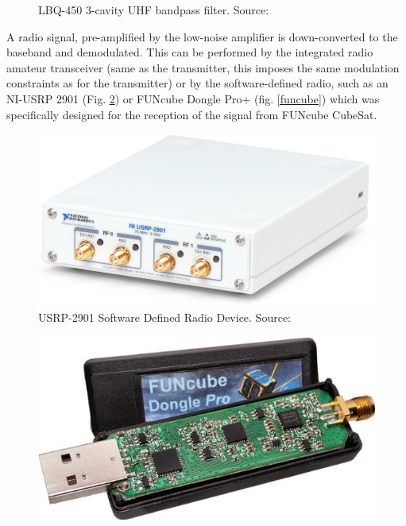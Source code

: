 \begin{minipage}{\linewidth}
\begin{minipage}{0.45\linewidth}
\begin{figure}[H]
            \caption{LBQ-450 3-cavity UHF bandpass filter. Source: \cite{cavity_uhf}}
            \label{cavity_uhf}
        \end{figure}
    \end{minipage}
\end{minipage}


A radio signal, pre-amplified by the low-noise amplifier is down-converted to the baseband and demodulated. This can be performed by the integrated radio amateur transceiver (same as the transmitter, this imposes the same modulation constraints as for the transmitter) or by the software-defined radio, such as an NI-USRP 2901 (Fig. \ref{ni_2901}) or FUNcube Dongle Pro+ (fig. \ref{funcube}) which was specifically designed for the reception of the signal from FUNcube CubeSat.

\begin{minipage}{\linewidth}
    \centering
    \begin{minipage}{0.45\linewidth}
        \begin{figure}[H]
            \centering
            \includegraphics[width=0.3\paperwidth]{img/4/ni_2901.png}
            \caption{USRP-2901 Software Defined Radio Device. Source: \cite{ni_2901}}
            \label{ni_2901}
        \end{figure}
    \end{minipage}
    \hspace{0.05\linewidth}
    \begin{minipage}{0.45\linewidth}
        \begin{figure}[H]
            \centering
            \includegraphics[width=0.3\paperwidth]{img/4/funcube.jpg}

\end{figure}
\end{minipage}
\end{minipage}
